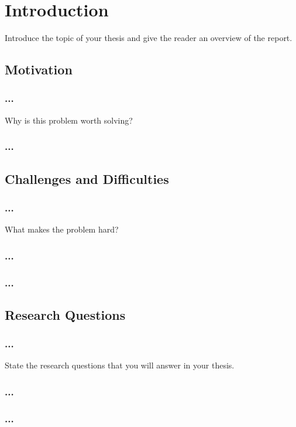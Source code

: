 \documentclass[../thesis.tex]{subfiles}
\begin{document}
    \chapter{Introduction}

    Introduce the topic of your thesis and give the reader an overview of the report.
    \section{Motivation}
    \subsection{...}

    Why is this problem worth solving?

    \subsection{...}


    \section{Challenges and Difficulties}
    \subsection{...}

    What makes the problem hard?

    \subsection{...}

    \subsection{...}



    \section{Research Questions}
    \subsection{...}

    State the research questions that you will answer in your thesis.

    \subsection{...}


    \subsection{...}
\end{document}
